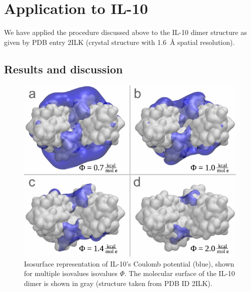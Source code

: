 


\section{Application to IL-10}

We have applied the procedure discussed above to the IL-10 dimer structure as
given by PDB entry 2ILK (crystal structure with \SI{1.6}{\angstrom} spatial
resolution).

\subsection{Results and discussion}
\label{bspred:il10}

\begin{figure}
\centering
\includegraphics[width=1.0\textwidth]{gfx/bspred/il10_top_coulomb_isosurfaces_different_values_03_ds.pdf}
\caption[]{
Isosurface representation of IL-10's Coulomb potential (blue), shown for
multiple isovalues isovalues $\Phi$. The molecular surface of the IL-10 dimer is
shown in gray (structure taken from PDB ID 2ILK).
}
\label{fig:bspred:il10_multi_iso}
\end{figure}


